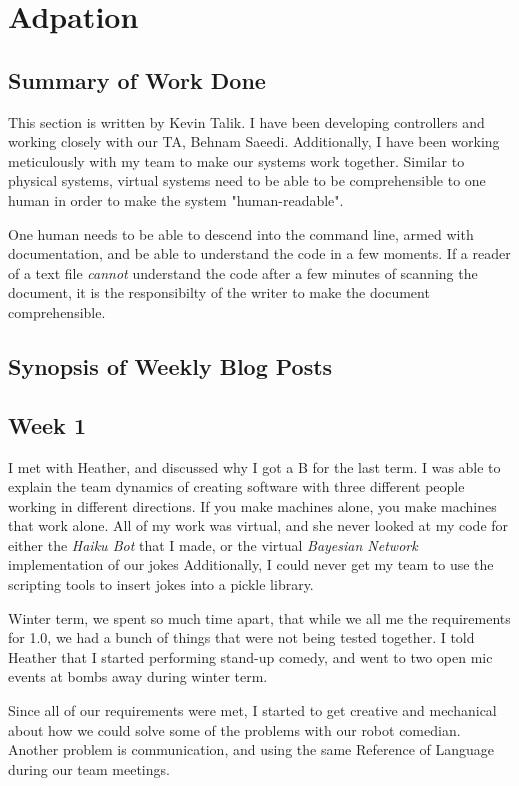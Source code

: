 \documentclass[onecolumn, draftclsnofoot,10pt, compsoc]{IEEEtran}
\begin{document}
\section{Adpation}
\subsection{Summary of Work Done}
 This section is written by Kevin Talik. I have been developing controllers and working closely with our TA, Behnam Saeedi. Additionally, I have been working meticulously with my team to make our systems work together. Similar to physical systems, virtual systems need to be able to be comprehensible to one human in order to make the system "human-readable".

 One human needs to be able to descend into the command line, armed with documentation, and be able to understand the code in a few moments. If a reader of a text file \textit{cannot} understand the code after a few minutes of scanning the document, it is the responsibilty of the writer to make the document comprehensible.
 \subsection{Synopsis of Weekly Blog Posts}

 \subsection{Week 1} I met with Heather, and discussed why I got a B for the last term. I was able to explain the team dynamics of creating software with three different people working in different directions. If you make machines alone, you make machines that work alone. All of my work was virtual, and she never looked at my code for either the \textit{Haiku Bot} that I made, or the virtual \textit{Bayesian Network} implementation of our jokes Additionally, I could never get my team to use the scripting tools to insert jokes into a pickle library.

Winter term, we spent so much time apart, that while we all me the requirements for 1.0, we had a bunch of things that were not being tested together. I told Heather that I started performing stand-up comedy, and went to two open mic events at bombs away during winter term.

Since all of our requirements were met, I started to get creative and mechanical about how we could solve some of the problems with our robot comedian. Another problem is communication, and using the same Reference of Language during our team meetings.
\end{document}
